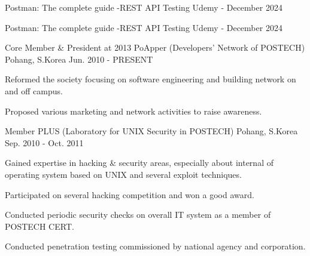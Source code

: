 


\begin{cventries}


\cventry
{} %
{Postman: The complete guide -REST API Testing} %
{Udemy - December 2024} %
{} 
{
}


\cventry
{} %
{Postman: The complete guide -REST API Testing} %
{Udemy - December 2024} %
{} 
{
}



\cventry
{Core Member \& President at 2013} %
{PoApper (Developers' Network of POSTECH)} %
{Pohang, S.Korea} %
{Jun. 2010 - PRESENT} %
{ %
\begin{cvitems}
\item {Reformed the society focusing on software engineering and building network on and off campus.}
\item {Proposed various marketing and network activities to raise awareness.}
\end{cvitems}
}


\cventry
{Member} %
{PLUS (Laboratory for UNIX Security in POSTECH)} %
{Pohang, S.Korea} %
{Sep. 2010 - Oct. 2011} %
{ %
\begin{cvitems}
\item {Gained expertise in hacking \& security areas, especially about internal of operating system based on UNIX and several exploit techniques.}
\item {Participated on several hacking competition and won a good award.}
\item {Conducted periodic security checks on overall IT system as a member of POSTECH CERT.}
\item {Conducted penetration testing commissioned by national agency and corporation.}
\end{cvitems}
}


\end{cventries}
